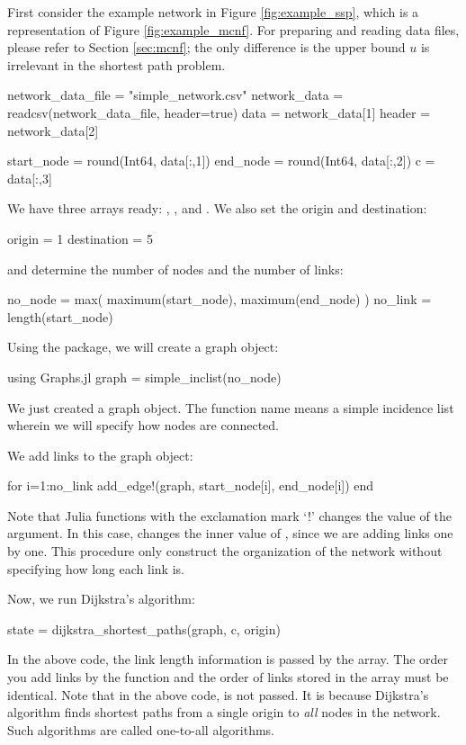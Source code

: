 First consider the example network in Figure \ref{fig:example_ssp}, which is a representation of Figure \ref{fig:example_mcnf}. For preparing and reading data files, please refer to Section \ref{sec:mcnf}; the only difference is the upper bound $u$ is irrelevant in the shortest path problem.
\begin{code}
network_data_file = "simple_network.csv"
network_data = readcsv(network_data_file,  header=true)
data = network_data[1]
header = network_data[2]

start_node = round(Int64, data[:,1])
end_node = round(Int64, data[:,2])
c = data[:,3]
\end{code}
\noindent We have three arrays ready: , , and . We also set the origin and destination:
\begin{code}
origin = 1
destination = 5
\end{code}
\noindent and determine the number of nodes and the number of links:
\begin{code}
no_node = max( maximum(start_node), maximum(end_node) )
no_link = length(start_node)
\end{code}



Using the  package, we will create a graph object:
\begin{code}
using Graphs.jl
graph = simple_inclist(no_node)
\end{code}
\noindent We just created a graph object. The function name  means a simple incidence list wherein we will specify how nodes are connected.

We add links to the graph object:
\begin{code}
for i=1:no_link
	add_edge!(graph, start_node[i], end_node[i])
end
\end{code}
\noindent Note that Julia functions with the exclamation mark `!' changes the value of the argument. In this case,  changes the inner value of , since we are adding links one by one. This procedure only construct the organization of the network without specifying how long each link is.

Now, we run Dijkstra's algorithm:
\begin{code}
state = dijkstra_shortest_paths(graph, c, origin)
\end{code}
\noindent In the above code, the link length information is passed by the  array. The order you add links by the  function and the order of links stored in the  array must be identical. Note that in the above code,  is not passed. It is because Dijkstra's algorithm finds shortest paths from a single origin to \emph{all} nodes in the network. Such algorithms are called one-to-all algorithms.



